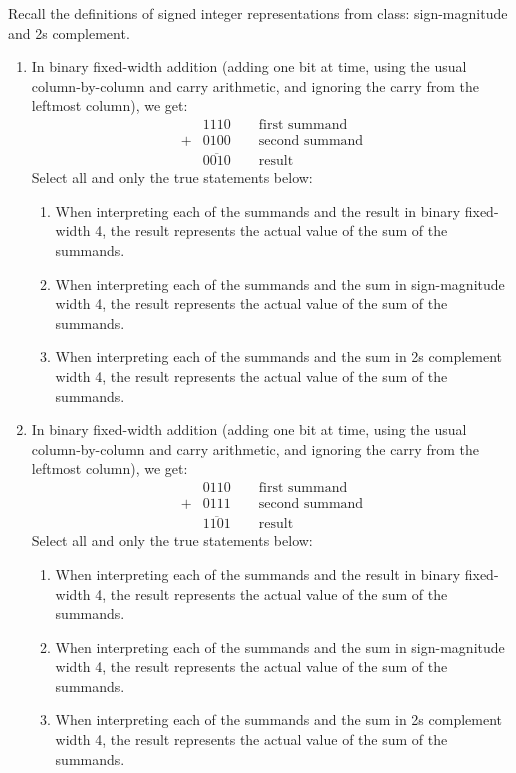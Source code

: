 
Recall the definitions of signed integer representations from class: 
sign-magnitude and 2s complement.

\begin{enumerate}
    \item In binary fixed-width addition (adding one bit at time, using 
    the usual column-by-column and carry arithmetic, and ignoring the carry 
    from the  leftmost column), we get: 
    \begin{align*}
        &1110  \qquad  \text{first summand}\\
        +&0100 \qquad  \text{second summand}\\
        &\overline{0010} \qquad \text{result}
    \end{align*}
    Select all and only the  true  statements below:
    \begin{enumerate}
        \item When interpreting each of the summands and the result in binary fixed-width 4, 
        the result represents the actual value of the sum of the summands.
        \item When interpreting each of the summands and the sum in sign-magnitude width 4, the result  
        represents the actual value of the sum of the summands.
        \item When interpreting each of the summands and the sum in 2s complement width 4, the result 
        represents the actual value of the sum of the summands.
    \end{enumerate}    
    \item In binary fixed-width addition (adding one bit at time, using the 
    usual column-by-column and carry arithmetic, and ignoring the carry from the 
    leftmost column), we get: 
    \begin{align*}
        &0110  \qquad  \text{first summand}\\
        +&0111 \qquad  \text{second summand}\\
        &\overline{1101} \qquad \text{result}
    \end{align*}
    Select all and only the  true  statements below:
    \begin{enumerate}
        \item When interpreting each of the summands and the result in binary fixed-width 4, 
        the result represents the actual value of the sum of the summands.
        \item When interpreting each of the summands and the sum in sign-magnitude width 4, 
        the result  
        represents the actual value of the sum of the summands.
        \item When interpreting each of the summands and the sum in 2s complement width 4, 
        the result 
        represents the actual value of the sum of the summands.
    \end{enumerate}   
\end{enumerate}